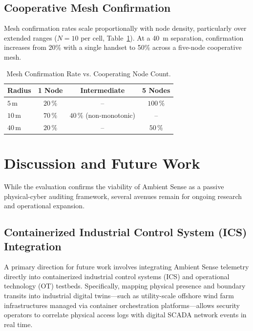 \documentclass[journal,10pt]{IEEEtran}
\begin{document}
\subsection{Cooperative Mesh Confirmation}
Mesh confirmation rates scale proportionally with node density, particularly over extended ranges ($N=10$ per cell, Table~\ref{tab:mesh}). At a 40~m separation, confirmation increases from 20\% with a single handset to 50\% across a five-node cooperative mesh.

\begin{table}[htb!]
  \centering
  \caption{Mesh Confirmation Rate vs. Cooperating Node Count.}
  \label{tab:mesh}
  \footnotesize
  \begin{tabular}{@{}lccc@{}}
    \toprule
    Radius & 1 Node & Intermediate & 5 Nodes \\
    \midrule
    $5$\,m  & $20\,\%$ & --                 & $100\,\%$ \\
    $10$\,m & $70\,\%$ & $40\,\%$ (non-monotonic) & --        \\
    $40$\,m & $20\,\%$ & --                 & $50\,\%$  \\
    \bottomrule
  \end{tabular}
\end{table}

\section{Discussion and Future Work}
While the evaluation confirms the viability of Ambient Sense as a passive physical-cyber auditing framework, several avenues remain for ongoing research and operational expansion.

\subsection{Containerized Industrial Control System (ICS) Integration}
A primary direction for future work involves integrating Ambient Sense telemetry directly into containerized industrial control systems (ICS) and operational technology (OT) testbeds. Specifically, mapping physical presence and boundary transits into industrial digital twins—such as utility-scale offshore wind farm infrastructures managed via container orchestration platforms—allows security operators to correlate physical access logs with digital SCADA network events in real time.
\end{document}
